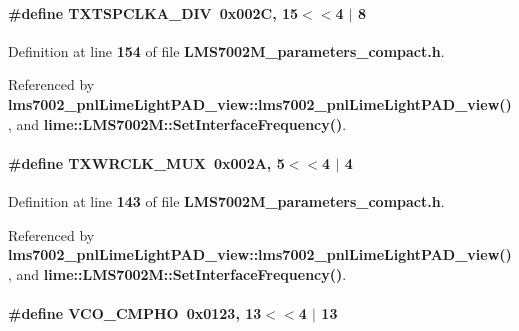 \paragraph[{T\+X\+T\+S\+P\+C\+L\+K\+A\+\_\+\+D\+IV}]{\setlength{\rightskip}{0pt plus 5cm}\#define T\+X\+T\+S\+P\+C\+L\+K\+A\+\_\+\+D\+IV~0x002\+C, 15$<$$<$4 $\vert$  8}\label{LMS7002M__parameters__compact_8h_aca353c7654de13b87d434f257764e84a}


Definition at line {\bf 154} of file {\bf L\+M\+S7002\+M\+\_\+parameters\+\_\+compact.\+h}.



Referenced by {\bf lms7002\+\_\+pnl\+Lime\+Light\+P\+A\+D\+\_\+view\+::lms7002\+\_\+pnl\+Lime\+Light\+P\+A\+D\+\_\+view()}, and {\bf lime\+::\+L\+M\+S7002\+M\+::\+Set\+Interface\+Frequency()}.

\paragraph[{T\+X\+W\+R\+C\+L\+K\+\_\+\+M\+UX}]{\setlength{\rightskip}{0pt plus 5cm}\#define T\+X\+W\+R\+C\+L\+K\+\_\+\+M\+UX~0x002\+A, 5$<$$<$4 $\vert$  4}\label{LMS7002M__parameters__compact_8h_ab557ff69574f5e28d940b14e316aa31a}


Definition at line {\bf 143} of file {\bf L\+M\+S7002\+M\+\_\+parameters\+\_\+compact.\+h}.



Referenced by {\bf lms7002\+\_\+pnl\+Lime\+Light\+P\+A\+D\+\_\+view\+::lms7002\+\_\+pnl\+Lime\+Light\+P\+A\+D\+\_\+view()}, and {\bf lime\+::\+L\+M\+S7002\+M\+::\+Set\+Interface\+Frequency()}.

\paragraph[{V\+C\+O\+\_\+\+C\+M\+P\+HO}]{\setlength{\rightskip}{0pt plus 5cm}\#define V\+C\+O\+\_\+\+C\+M\+P\+HO~0x0123, 13$<$$<$4 $\vert$  13}\label{LMS7002M__parameters__compact_8h_a49f6d4f43100574de2520099c06be75f}


